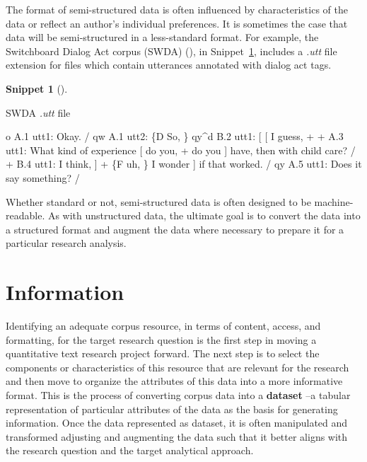 \documentclass[
  letterpaper,
  krantz1]{latex/krantz-mod}
\newenvironment{Shaded}{\begin{snugshade}}{\end{snugshade}}
\newcommand{\NormalTok}[1]{\textcolor[rgb]{0.00,0.00,0.00}{#1}}
\theoremstyle{definition}
\theoremstyle{definition}
\newtheorem{definition}{Snippet}[chapter]
\theoremstyle{remark}
\begin{document}
The format of semi-structured data is often influenced by
characteristics of the data or reflect an author's individual
preferences. It is sometimes the case that data will be semi-structured
in a less-standard format. For example, the Switchboard Dialog Act
corpus (SWDA) (), in Snippet~\ref{def-swda-utt}, includes a \emph{.utt} file
extension for files which contain utterances annotated with dialog act
tags.

\begin{definition}[]\protect\hypertarget{def-swda-utt}{}\label{def-swda-utt}

SWDA \emph{.utt} file

\begin{Shaded}
\begin{Highlighting}[]
\NormalTok{o      A.1 utt1: Okay. /}
\NormalTok{qw     A.1 utt2: \{D So, \}}
\NormalTok{qy\^{}d   B.2 utt1: [ [ I guess, +}
\NormalTok{+      A.3 utt1: What kind of experience [ do you, + do you ] have, then with child care? /}
\NormalTok{+      B.4 utt1: I think, ] + \{F uh, \} I wonder ] if that worked. /}
\NormalTok{qy     A.5 utt1: Does it say something? /}
\end{Highlighting}
\end{Shaded}

\end{definition}

Whether standard or not, semi-structured data is often designed to be
machine-readable. As with unstructured data, the ultimate goal is to
convert the data into a structured format and augment the data where
necessary to prepare it for a particular research analysis.

\section{Information}\label{information}

Identifying an adequate corpus resource, in terms of content, access,
and formatting, for the target research question is the first step in
moving a quantitative text research project forward. The next step is to
select the components or characteristics of this resource that are
relevant for the research and then move to organize the attributes of
this data into a more informative format. This is the process of
converting corpus data into a \textbf{dataset} --a
tabular representation of particular attributes of the data as the basis
for generating information. Once the data represented as dataset, it is
often manipulated and transformed adjusting and augmenting the data such
that it better aligns with the research question and the target
analytical approach.
\end{document}
